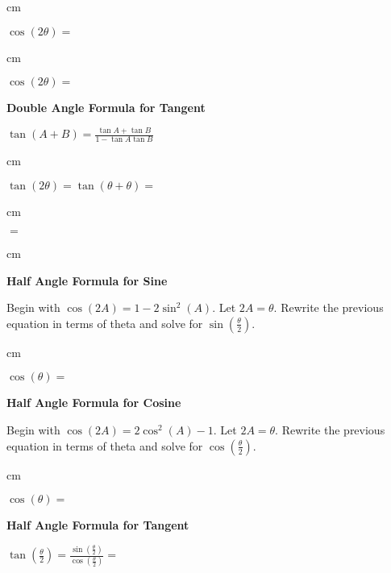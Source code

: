 \documentclass[numbers]{ximera}
\begin{document}
 cm

$\cos (2\theta) = $

 cm

$\cos (2\theta) = $

\newpage

{\bf {Double Angle Formula for Tangent}}

\bigskip

$\tan (A+B) = \displaystyle{\frac{\tan A + \tan B}{1-\tan A \tan B}}$

 cm

$\tan (2 \theta) = \tan (\theta + \theta) = $

 cm

$= $

 cm

\vfill

{\bf {Half Angle Formula for Sine}}

\bigskip

Begin with $\cos(2A) = 1 - 2 \sin^2(A)$. Let $2A = \theta$. Rewrite the previous equation in terms of theta and solve for $\sin(\frac{\theta}{2})$.

 cm

$\cos(\theta) = $

\vfill

{\bf {Half Angle Formula for Cosine}}

\bigskip

Begin with $\cos(2A) = 2 \cos^2(A) - 1$. Let $2A = \theta$. Rewrite the previous equation in terms of theta and solve for $\cos(\frac{\theta}{2})$.

 cm

$\cos(\theta) = $

\vfill

{\bf {Half Angle Formula for Tangent}}

\bigskip

$\displaystyle{\tan\left(\frac{\theta}{2}\right) = \frac{\sin(\frac{\theta}{2})}{\cos(\frac{\theta}{2})} = }$

\vfill
\end{document}

